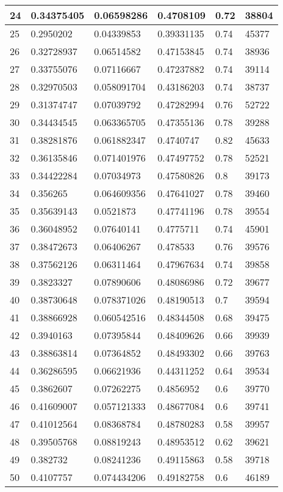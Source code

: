 \begin{longtable}{|l|l|l|l|l|l|}
24 & 0.34375405 & 0.06598286 & 0.4708109 & 0.72 & 38804 \\ \hline 
25 & 0.2950202 & 0.04339853 & 0.39331135 & 0.74 & 45377 \\ \hline 
26 & 0.32728937 & 0.06514582 & 0.47153845 & 0.74 & 38936 \\ \hline 
27 & 0.33755076 & 0.07116667 & 0.47237882 & 0.74 & 39114 \\ \hline 
28 & 0.32970503 & 0.058091704 & 0.43186203 & 0.74 & 38737 \\ \hline 
29 & 0.31374747 & 0.07039792 & 0.47282994 & 0.76 & 52722 \\ \hline 
30 & 0.34434545 & 0.063365705 & 0.47355136 & 0.78 & 39288 \\ \hline 
31 & 0.38281876 & 0.061882347 & 0.4740747 & 0.82 & 45633 \\ \hline 
32 & 0.36135846 & 0.071401976 & 0.47497752 & 0.78 & 52521 \\ \hline 
33 & 0.34422284 & 0.07034973 & 0.47580826 & 0.8 & 39173 \\ \hline 
34 & 0.356265 & 0.064609356 & 0.47641027 & 0.78 & 39460 \\ \hline 
35 & 0.35639143 & 0.0521873 & 0.47741196 & 0.78 & 39554 \\ \hline 
36 & 0.36048952 & 0.07640141 & 0.4775711 & 0.74 & 45901 \\ \hline 
37 & 0.38472673 & 0.06406267 & 0.478533 & 0.76 & 39576 \\ \hline 
38 & 0.37562126 & 0.06311464 & 0.47967634 & 0.74 & 39858 \\ \hline 
39 & 0.3823327 & 0.07890606 & 0.48086986 & 0.72 & 39677 \\ \hline 
40 & 0.38730648 & 0.078371026 & 0.48190513 & 0.7 & 39594 \\ \hline 
41 & 0.38866928 & 0.060542516 & 0.48344508 & 0.68 & 39475 \\ \hline 
42 & 0.3940163 & 0.07395844 & 0.48409626 & 0.66 & 39939 \\ \hline 
43 & 0.38863814 & 0.07364852 & 0.48493302 & 0.66 & 39763 \\ \hline 
44 & 0.36286595 & 0.06621936 & 0.44311252 & 0.64 & 39534 \\ \hline 
45 & 0.3862607 & 0.07262275 & 0.4856952 & 0.6 & 39770 \\ \hline 
46 & 0.41609007 & 0.057121333 & 0.48677084 & 0.6 & 39741 \\ \hline 
47 & 0.41012564 & 0.08368784 & 0.48780283 & 0.58 & 39957 \\ \hline 
48 & 0.39505768 & 0.08819243 & 0.48953512 & 0.62 & 39621 \\ \hline 
49 & 0.382732 & 0.08241236 & 0.49115863 & 0.58 & 39718 \\ \hline 
50 & 0.4107757 & 0.074434206 & 0.49182758 & 0.6 & 46189 \\ \hline 
\end{longtable}